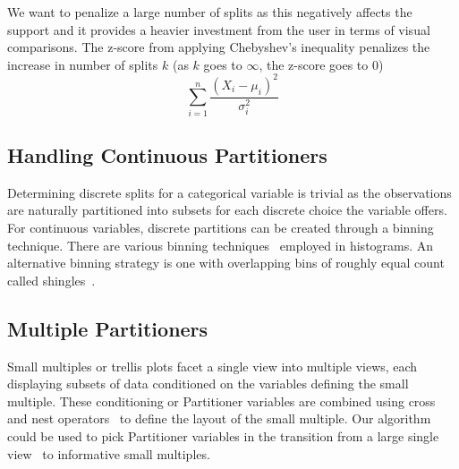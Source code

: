 We want to penalize a large number of splits as this negatively affects the support and it provides a heavier investment from the user in terms of visual comparisons. The z-score from applying Chebyshev's inequality  penalizes the increase in number of splits $k$ (as $k$ goes to $\infty$, the z-score goes to $0$)
$$\sum_{i=1}^n \frac{(X_i-\mu_i)^2}{\sigma_i^2}$$

\subsection{Handling Continuous Partitioners}
Determining discrete splits for a categorical variable is trivial as the observations are naturally partitioned into subsets for each discrete choice the variable offers. For continuous variables, discrete partitions can be created through a binning technique. There are various binning techniques~\cite{Freedman1981,Scott2009} employed in histograms. An alternative binning strategy is one with overlapping bins of roughly equal count called shingles~\cite{Becker1996 ?Cleveland book first??}.

\subsection{Multiple Partitioners}
Small multiples or trellis plots facet a single view into multiple views, each displaying subsets of data conditioned on the variables defining the small multiple. These conditioning or Partitioner variables are combined using cross and nest operators~\cite{Wilkinson2005GG,Stolte2002} to define the layout of the small multiple. Our algorithm could be used to pick Partitioner variables in the transition from a large single view~\cite{van2013} to informative small multiples.


